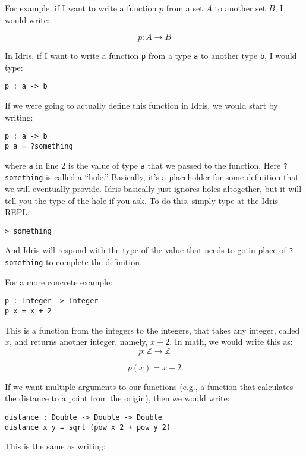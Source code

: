 \documentclass{article}
\newcommand{\inline}[1]{\texttt{#1}}
\begin{document}
For example, if I want to write a function $p$ from a set $A$ to another set $B$, I would write:

$$p : A \rightarrow B$$

In Idris, if I want to write a function \inline{p} from a type \inline{a} to another type \inline{b}, I would type:

\begin{verbatim}
p : a -> b
\end{verbatim}

If we were going to actually define this function in Idris, we would start by writing:

\begin{verbatim}
p : a -> b
p a = ?something
\end{verbatim}

where \inline{a} in line 2 is the value of type \inline{a} that we passed to the function.
Here \inline{?something} is called a ``hole.''
Basically, it's a placeholder for some definition that we will eventually provide.
Idris basically just ignores holes altogether, but it will tell you the type of the hole if you ask.
To do this, simply type at the Idris REPL:

\begin{verbatim}
> something
\end{verbatim}

And Idris will respond with the type of the value that needs to go in place of \inline{?something} to complete the definition.

For a more concrete example:

\begin{verbatim}
p : Integer -> Integer
p x = x + 2
\end{verbatim}

This is a function from the integers to the integers, that takes any integer, called $x$, and returns another integer, namely, $x + 2$.
In math, we would write this as:
\[
    p : \mathbb{Z} \rightarrow \mathbb{Z}
\]

\[
    p(x) = x + 2
\]

If we want multiple arguments to our functions (e.g., a function that calculates the distance to a point from the origin), then we would write:

\begin{verbatim}
distance : Double -> Double -> Double
distance x y = sqrt (pow x 2 + pow y 2)
\end{verbatim}

This is the same as writing:
\end{document}
